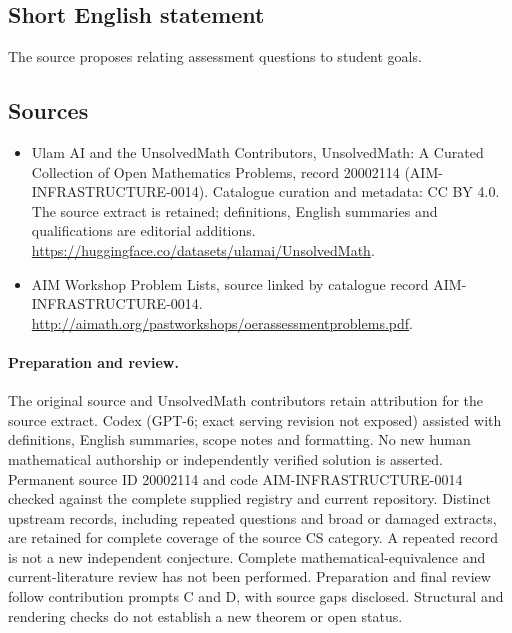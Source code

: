 \documentclass[11pt]{article}
\begin{document}
\subsection{Short English statement}
The source proposes relating assessment questions to student goals.
\subsection{Sources}
\begin{itemize}
\item[\hypertarget{source:20002114:1}{S1}] Ulam AI and the UnsolvedMath Contributors, UnsolvedMath: A Curated Collection of Open Mathematics Problems, record 20002114 (AIM-INFRASTRUCTURE-0014). Catalogue curation and metadata: CC BY 4.0. The source extract is retained; definitions, English summaries and qualifications are editorial additions.
\url{https://huggingface.co/datasets/ulamai/UnsolvedMath}.
\item[\hypertarget{source:20002114:2}{S2}] AIM Workshop Problem Lists, source linked by catalogue record AIM-INFRASTRUCTURE-0014.
\url{http://aimath.org/pastworkshops/oerassessmentproblems.pdf}.
\end{itemize}
\paragraph{Preparation and review.}
The original source and UnsolvedMath contributors retain attribution for the source extract. Codex (GPT-6; exact serving revision not exposed) assisted with definitions, English summaries, scope notes and formatting. No new human mathematical authorship or independently verified solution is asserted. Permanent source ID 20002114 and code AIM-INFRASTRUCTURE-0014 checked against the complete supplied registry and current repository. Distinct upstream records, including repeated questions and broad or damaged extracts, are retained for complete coverage of the source CS category. A repeated record is not a new independent conjecture. Complete mathematical-equivalence and current-literature review has not been performed. Preparation and final review follow contribution prompts C and D, with source gaps disclosed. Structural and rendering checks do not establish a new theorem or open status.
\label{end:20002114}
\end{document}
